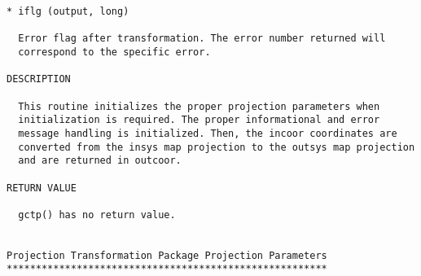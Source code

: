 \begin{verbatim}
* iflg (output, long)

  Error flag after transformation. The error number returned will
  correspond to the specific error.

DESCRIPTION

  This routine initializes the proper projection parameters when
  initialization is required. The proper informational and error
  message handling is initialized. Then, the incoor coordinates are
  converted from the insys map projection to the outsys map projection
  and are returned in outcoor.

RETURN VALUE

  gctp() has no return value.


Projection Transformation Package Projection Parameters
*******************************************************


\end{verbatim}
